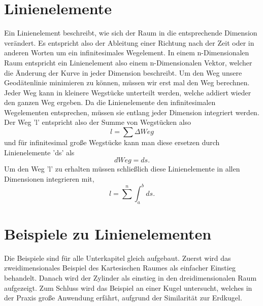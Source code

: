 %
%
%
%
\section{Linienelemente\label{geodaeten:section:Linienelemente}}

Ein Linienelement beschreibt, wie sich der Raum in die entsprechende Dimension verändert.
Es entspricht also der Ableitung einer Richtung nach der Zeit oder in anderen Worten um ein infinitesimales Wegelement.
In einem n-Dimensionalen Raum entspricht ein Linienelement also einem n-Dimensionalen Vektor, welcher die Änderung der Kurve in jeder Dimension beschreibt.
Um den Weg unsere Geodätenlinie minimieren zu können, müssen wir erst mal den Weg berechnen.
Jeder Weg kann in kleinere Wegstücke unterteilt werden, welche addiert wieder den ganzen Weg ergeben.
Da die Linienelemente den infinitesimalen Wegelementen entsprechen, müssen sie entlang jeder Dimension integriert werden.
Der Weg 'l' entspricht also der Summe von Wegstücken also
\begin{equation}
	l = \sum \Delta Weg
\end{equation}
und für infinitesimal große Wegstücke kann man diese ersetzen durch Linienelemente 'ds'  als
\begin{equation}	
	dWeg = ds .
	\label{geodaeten:Linienelemente:equation1}
\end{equation}
Um den Weg 'l' zu erhalten müssen schließlich diese Linienelemente in allen Dimensionen integrieren mit,
\begin{equation}
	l = 
	\sum^{n} \int_a^b ds .
	\label{geodaeten:Linienelemente:equation2}
\end{equation}

\section{Beispiele zu Linienelementen}
Die Beispiele sind für alle Unterkapitel gleich aufgebaut.
Zuerst wird das zweidimensionales Beispiel des Kartesischen Raumes als einfacher Einstieg behandelt.
Danach wird der Zylinder als einstieg in den dreidimensionalen Raum aufgezeigt.
Zum Schluss wird das Beispiel an einer Kugel untersucht, welches in der Praxis große Anwendung erfährt, aufgrund der Similarität zur Erdkugel.

	
	
	

